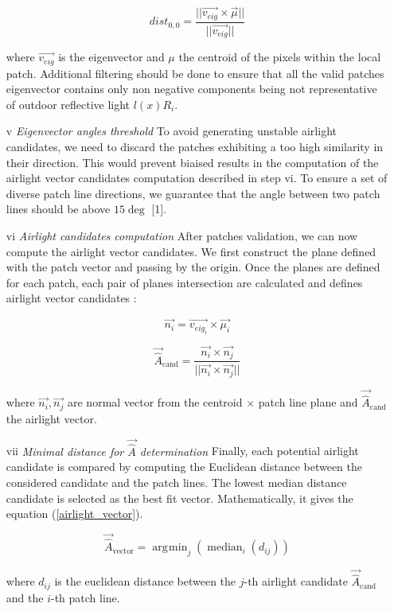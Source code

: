 \documentclass[conference]{IEEEtran}
\DeclareMathOperator*{\argmin}{\arg\!\min}
\begin{document}
\begin{itemize}[]
\begin{equation}
\label{Distance to origin}
dist_{0,0} = \frac{||\vec{v_{eig}} \times \vec{\mu}||}{||\vec{v_{eig}}||}
\end{equation}

where $\vec{v_{eig}}$ is the eigenvector and $\mu$ the centroid of the pixels within the local patch.
Additional filtering should be done to ensure that all the valid patches eigenvector contains only non negative components being 
not representative of outdoor reflective light $l(x)R_i$.

\item[v] \textit{Eigenvector angles threshold} To avoid generating unstable airlight candidates, we need to discard the patches 
exhibiting a too high similarity in their direction. This would prevent biaised results in the computation of the airlight vector
 candidates computation described in step vi.  To ensure a set of diverse patch line directions, we guarantee that the angle between two patch lines 
should be above $15 \deg$ [1].
\item[vi] \textit{Airlight candidates computation}  After patches validation, we can now compute the airlight vector candidates.
We first construct the plane defined with the patch vector and passing by the origin.  Once the planes are defined for each patch, each pair of planes 
 intersection are calculated and defines airlight vector candidates :

\begin{equation}
\label{Normal_vector}
\vec{n_i} = \vec{v_{eig_i}} \times \vec{\mu_i}
\end{equation}

\begin{equation}
\label{airlight_candidate}
\vec{\hat{A}}_{\text{cand}} = \frac{\vec{n_i} \times \vec{n_j}}{||\vec{n_i} \times \vec{n_j}||} 
\end{equation}

where $\vec{n_i}, \vec{n_j}$ are normal vector from the {centroid $\times$ patch line} plane and $\vec{\hat{A}}_{\text{cand}}$ the airlight vector.
\item[vii] \textit{Minimal distance for $\vec{\hat{A}}$ determination} Finally, each potential airlight candidate is compared by
computing the Euclidean distance between the considered candidate and the patch lines.  The lowest median distance candidate is selected as
the best fit vector.  Mathematically, it gives the equation (\ref{airlight_vector}).

\begin{equation}
\label{airlight_vector}
\vec{\hat{A}}_{\text{vector}} = \argmin_j(\operatorname{median}_i(d_{ij})) 
\end{equation}

where $d_{ij}$ is the euclidean distance between the $j$-th airlight candidate $\vec{\hat{A}}_{\text{cand}}$ and the $i$-th patch line.
\end{itemize}   
\end{document}
